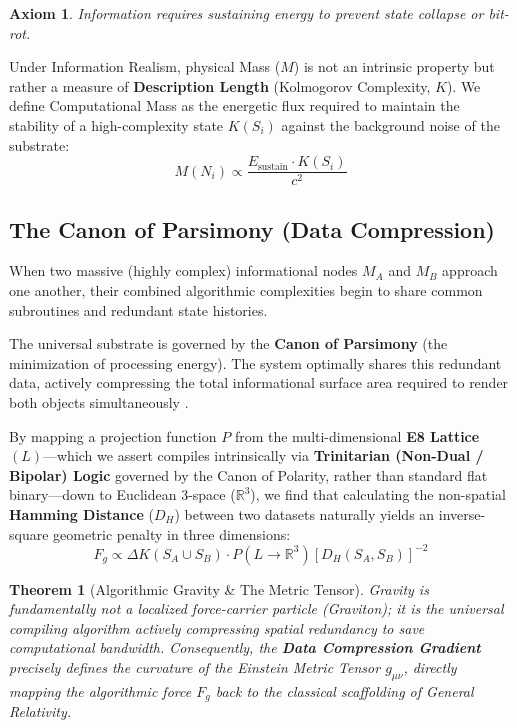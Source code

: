 \documentclass[12pt, a4paper]{article}
\theoremstyle{plain}
\newtheorem{theorem}{Theorem}[section]
\newtheorem{axiom}{Axiom}
\theoremstyle{definition}
\begin{document}
\begin{axiom}
Information requires sustaining energy to prevent state collapse or bit-rot.
\end{axiom}

Under Information Realism, physical Mass ($M$) is not an intrinsic property but rather a measure of \textbf{Description Length} (Kolmogorov Complexity, $K$). We define Computational Mass as the energetic flux required to maintain the stability of a high-complexity state $K(S_i)$ against the background noise of the substrate:
\begin{equation}
M(N_i) \propto \frac{E_{\text{sustain}} \cdot K(S_i)}{c^2}
\end{equation}

\subsection{The Canon of Parsimony (Data Compression)}

When two massive (highly complex) informational nodes $M_A$ and $M_B$ approach one another, their combined algorithmic complexities begin to share common subroutines and redundant state histories. 

The universal substrate is governed by the \textbf{Canon of Parsimony} (the minimization of processing energy). The system optimally shares this redundant data, actively compressing the total informational surface area required to render both objects simultaneously \citep{Hooft1993, Vitanyi2008}.

By mapping a projection function $P$ from the multi-dimensional \textbf{E8 Lattice} $(L)$---which we assert compiles intrinsically via \textbf{Trinitarian (Non-Dual / Bipolar) Logic} governed by the Canon of Polarity, rather than standard flat binary---down to Euclidean 3-space ($\mathbb{R}^3$), we find that calculating the non-spatial \textbf{Hamming Distance} ($D_H$) between two datasets naturally yields an inverse-square geometric penalty in three dimensions:
\begin{equation}
F_g \propto \Delta K(S_A \cup S_B) \cdot P(L \to \mathbb{R}^3)[D_H(S_A, S_B)]^{-2}
\end{equation}

\begin{theorem}[Algorithmic Gravity \& The Metric Tensor]
Gravity is fundamentally not a localized force-carrier particle (Graviton); it is the universal compiling algorithm actively compressing spatial redundancy to save computational bandwidth. Consequently, the \textbf{Data Compression Gradient} precisely defines the curvature of the Einstein Metric Tensor $g_{\mu\nu}$, directly mapping the algorithmic force $F_g$ back to the classical scaffolding of General Relativity.
\end{theorem}
\end{document}
